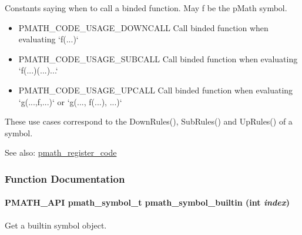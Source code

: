 Constants saying when to call a binded function. May f be the pMath symbol. 

\begin{itemize}
\item PMATH\_\-CODE\_\-USAGE\_\-DOWNCALL Call binded function when evaluating `f(...)`\end{itemize}


\begin{itemize}
\item PMATH\_\-CODE\_\-USAGE\_\-SUBCALL Call binded function when evaluating `f(...)(...)...`\end{itemize}


\begin{itemize}
\item PMATH\_\-CODE\_\-USAGE\_\-UPCALL Call binded function when evaluating `g(...,f,...)` or `g(..., f(...), ...)`\end{itemize}


These use cases correspond to the DownRules(), SubRules() and UpRules() of a symbol.

\begin{Desc}
\item[See also:]\hyperlink{group__symbols_gd02a05fa96992d137b450627486ec0b5}{pmath\_\-register\_\-code} \end{Desc}


\subsubsection{Function Documentation}
\hypertarget{group__symbols_ge9a166b048d04e6ef25632127f0172ba}{
\paragraph[{pmath\_\-symbol\_\-builtin}]{\setlength{\rightskip}{0pt plus 5cm}PMATH\_\-API {\bf pmath\_\-symbol\_\-t} pmath\_\-symbol\_\-builtin (int {\em index})}\hfill}
\label{group__symbols_ge9a166b048d04e6ef25632127f0172ba}


Get a builtin symbol object. 

